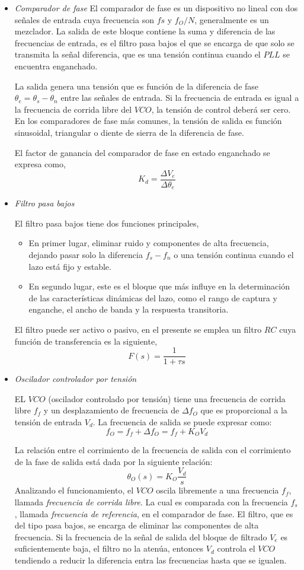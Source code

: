 \documentclass[twocolumn]{article}
\begin{document}
\begin{itemize}
	\item \textit{Comparador de fase} 
		El comparador de fase es un dispositivo no lineal con dos señales de entrada cuya frecuencia son $fs$ y $f_O/N$, generalmente es un mezclador. La salida de este bloque contiene la suma y diferencia de las frecuencias de entrada, es el filtro pasa bajos el que se encarga de que solo se transmita la señal diferencia, que es una tensión continua cuando el $PLL$ se encuentra enganchado.

La salida genera una tensión que es función de la diferencia de fase $\theta_e = \theta_s - \theta_n$ entre las señales de entrada. Si la frecuencia de entrada es igual a la frecuencia de corrida libre del $VCO$, la tensión de control deberá ser cero. En los comparadores de fase más comunes, la tensión de salida es función sinusoidal, triangular o diente de sierra de la diferencia de fase.

	El factor de ganancia del comparador de fase en estado enganchado se expresa como,
	\[ K_d = \frac{\Delta V_e}{\Delta \theta_e} \]

  \item \textit{Filtro pasa bajos} 

	  El filtro pasa bajos tiene dos funciones principales,
	\begin{itemize}
	  \item En primer lugar, eliminar ruido y componentes de alta frecuencia, dejando pasar solo la diferencia $f_s - f_n$ o una tensión continua cuando el lazo está fijo y estable.
	  \item En segundo lugar, este es el bloque que más influye en la determinación de las características dinámicas del lazo, como el rango de captura y enganche, el ancho de banda y la respuesta transitoria.
	\end{itemize}
El filtro puede ser activo o pasivo, en el presente se emplea un filtro $RC$ cuya función de transferencia es la siguiente,
$$ F(s) = \frac{1}{1 + \tau s} $$

\item \textit{Oscilador controlador por tensión} 

	EL $VCO$ (oscilador controlado por tensión) tiene una frecuencia de corrida libre $f_f$ y un desplazamiento de frecuencia de $\Delta f_O$ que es proporcional a la tensión de entrada $V_d$. La frecuencia de salida se puede expresar como:
\[ f_O = f_f + \Delta f_O = f_f + K_O V_d \]

La relación entre el corrimiento de la frecuencia de salida con el corrimiento de la fase de salida está dada por la siguiente relación:
\[ \theta_O (s) = K_O \frac{V_d}{s} \]
Analizando el funcionamiento, el $VCO$ oscila libremente a una frecuencia $f_f$, llamada \textit{frecuencia de corrida libre}. La cual es comparada con la frecuencia $f_s$, llamada \textit{frecuencia de referencia}, en el comparador de fase. El filtro, que es del tipo pasa bajos, se encarga de eliminar las componentes de alta frecuencia. Si la frecuencia de la señal de salida del bloque de filtrado $V_e$ es suficientemente baja, el filtro no la atenúa, entonces $V_d$ controla el $VCO$ tendiendo a reducir la diferencia entra las frecuencias hasta que se igualen.


\end{itemize}
\end{document}
